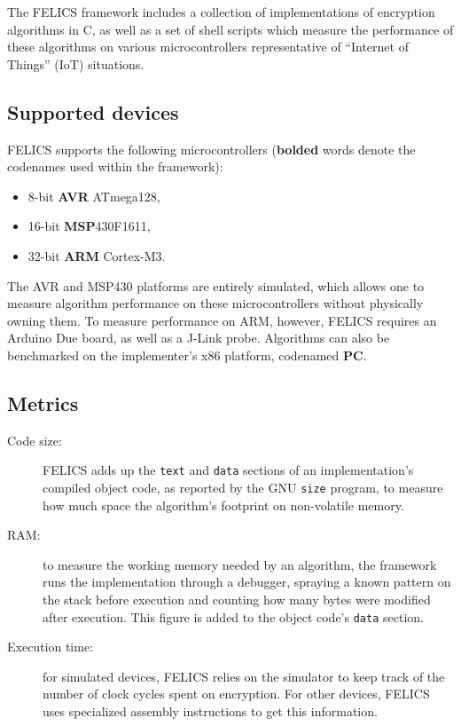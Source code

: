\documentclass{article}
\begin{document}
The FELICS framework\cite{FELICS:paper} includes a collection of
implementations of encryption algorithms in C, as well as a set of
shell scripts which measure the performance of these algorithms on
various microcontrollers representative of ``Internet of Things''
(IoT) situations.

\subsection{Supported devices}
\label{sec:felics/devices}

FELICS supports the following microcontrollers (\textbf{bolded} words
denote the codenames used within the framework):

\begin{itemize}
\item 8-bit \textbf{AVR} ATmega128,
\item 16-bit \textbf{MSP}430F1611,
\item 32-bit \textbf{ARM} Cortex-M3.
\end{itemize}

The AVR and MSP430 platforms are entirely simulated, which allows one
to measure algorithm performance on these microcontrollers without
physically owning them.  To measure performance on ARM, however,
FELICS requires an Arduino Due board, as well as a J-Link probe.
Algorithms can also be benchmarked on the implementer's x86 platform,
codenamed \textbf{PC}.

\subsection{Metrics}
\label{sec:felics/metrics}

\begin{description}
\item[Code size:] FELICS adds up the \texttt{text} and \texttt{data}
  sections of an implementation's compiled object code, as reported by
  the GNU \texttt{size} program, to measure how much space the
  algorithm's footprint on non-volatile memory.

\item[RAM:] to measure the working memory needed by an algorithm, the
  framework runs the implementation through a debugger, spraying a
  known pattern on the stack before execution and counting how many
  bytes were modified after execution.  This figure is added to the
  object code's \texttt{data} section.

\item[Execution time:] for simulated devices, FELICS relies on the
  simulator to keep track of the number of clock cycles spent on
  encryption.  For other devices, FELICS uses specialized assembly
  instructions to get this information.
\end{description}
\end{document}
